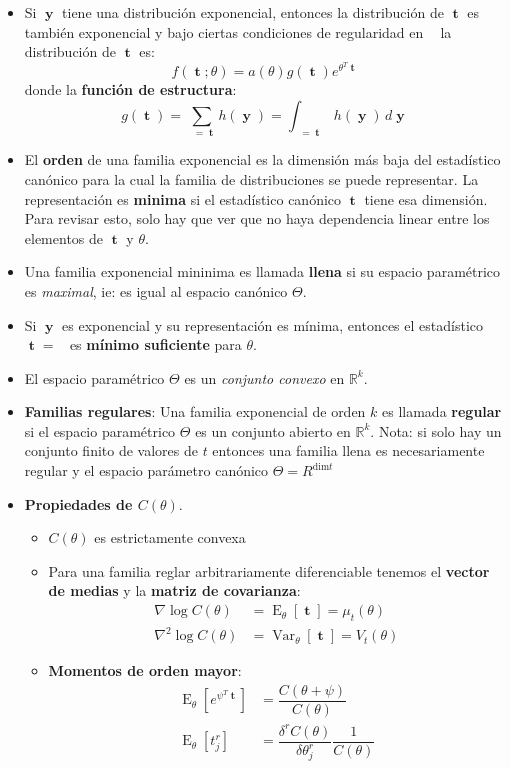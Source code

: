 \documentclass[pdftex,11pt,a4paper]{article}
\DeclareMathOperator{\muestra}{\mathbf{y}}
\DeclareMathOperator{\est}{\mathbf{t}}
\DeclareMathOperator{\ty}{\mathbf{t}(\muestra)}
\DeclareMathOperator{\E}{E}
\DeclareMathOperator{\Var}{Var}
\begin{document}
\begin{itemize}
	\item Si $\muestra$ tiene una distribución exponencial, entonces la distribución de $\est$ es también exponencial y bajo ciertas condiciones de regularidad en $\ty$ la distribución de $\est$ es:$$f(\est;\theta) = a(\theta)g(\est)e^{\theta^T\est}$$ donde la \textbf{función de estructura}: $$g(\est) = \sum_{\ty = \est}h(\muestra) = \int_{\ty = \est}h(\muestra) \,d\muestra$$
	\item El \textbf{orden} de una familia exponencial es la dimensión más baja del estadístico canónico para la cual la familia de distribuciones se puede representar. La representación es \textbf{minima} si el estadístico canónico $\est$ tiene esa dimensión. Para revisar esto, solo hay que ver que no haya dependencia linear entre los elementos de $\est$ y $\theta$. 
	\item  Una familia exponencial mininima es llamada \textbf{llena} si su espacio paramétrico es \emph{maximal}, ie: es igual al espacio canónico $\Theta$. 
	\item Si $\muestra$ es exponencial y su representación es mínima, entonces el estadístico $\est = \ty$ es \textbf{mínimo suficiente} para $\theta$. 
	\item El espacio paramétrico $\Theta$ es un \emph{conjunto convexo} en $\mathbb{R}^k$.
	\item \textbf{Familias regulares}: Una familia exponencial de orden $k$ es llamada \textbf{regular} si el espacio paramétrico $\Theta$ es un conjunto abierto en $\mathbb{R}^k$. Nota: si solo hay un conjunto finito de valores de $t$ entonces una familia llena es necesariamente regular y el espacio parámetro canónico $\Theta = R^{\text{dim}t}$
	\item \textbf{Propiedades de $C(\theta)$}.
	\begin{itemize}
		\item $C(\theta)$ es estrictamente convexa
		\item Para una familia reglar arbitrariamente diferenciable tenemos el \textbf{vector de medias} y la \textbf{matriz de covarianza}:
		\begin{align*}
			\nabla \log C(\theta) &= \E_\theta[\est] = \mu_t(\theta)\\
			\nabla^2 \log C(\theta) &= \Var_\theta[\est] = V_t(\theta)
		\end{align*}
		\item \textbf{Momentos de orden mayor}:
		\begin{align*}
			\E_\theta[e^{\psi^T\est}] &= \dfrac{C(\theta + \psi)}{C(\theta)} \\
			\E_\theta[t_j^r] &= \dfrac{\delta^rC(\theta)}{\delta\theta_j^r}\dfrac{1}{C(\theta)}
		\end{align*}
	\end{itemize}
\end{itemize}
\end{document}
